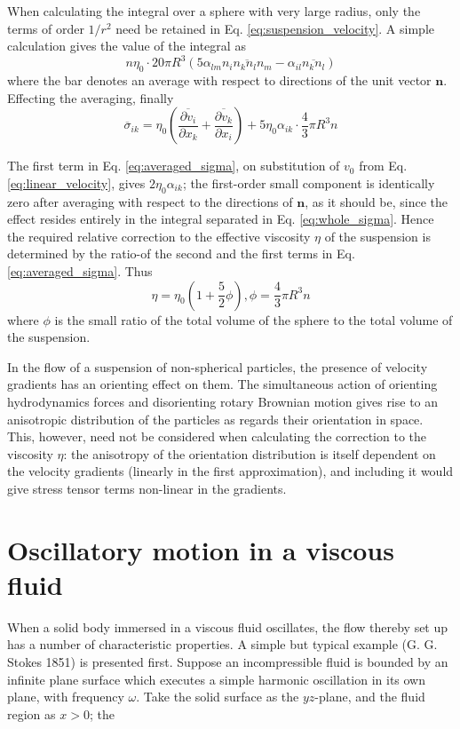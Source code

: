 \documentclass[conference]{IEEEtran}
\theoremstyle{definition}
\theoremstyle{remark}
\begin{document}
    When calculating the integral over a sphere with very large radius, only the terms of order $1/r^2$ need be retained in Eq. \ref{eq:suspension_velocity}. A simple calculation gives the value of the integral as
    \begin{equation*}
        n \eta_0 \cdot 20 \pi R^3 (5 \alpha_{lm} \overline{n_i n_k n_l n_m} - \alpha_{il} \overline{n_k n_l})
    \end{equation*}
    where the bar denotes an average with respect to directions of the unit vector $\mathbf{n}$. Effecting the averaging, finally
    \begin{equation}
        \overline{\sigma}_{ik} = \eta_0 \left( \dfrac{\overline{\partial v_i}}{\partial x_k} + \dfrac{\overline{\partial v_k}}{\partial x_i} \right) + 5 \eta_0 \alpha_{ik} \cdot \dfrac43 \pi R^3 n
        \label{eq:averaged_sigma}
    \end{equation}

    The first term in Eq. \ref{eq:averaged_sigma}, on substitution of $v_0$ from Eq. \ref{eq:linear_velocity}, gives $2 \eta_0 \alpha_{ik}$; the first-order small component is identically zero after averaging with respect to the directions of $\mathbf{n}$, as it should be, since the effect resides entirely in the integral separated in Eq. \ref{eq:whole_sigma}. Hence the required relative correction to the effective viscosity $\eta$ of the suspension is determined by the ratio-of the second and the first terms in Eq. \ref{eq:averaged_sigma}. Thus
    \begin{equation}
        \eta = \eta_0 (1 + \dfrac52 \phi), \phi = \dfrac43 \pi R^3 n
    \end{equation}
    where $\phi$ is the small ratio of the total volume of the sphere to the total volume of the suspension.

    In the flow of a suspension of non-spherical particles, the presence of velocity gradients has an orienting effect on them. The simultaneous action of orienting hydrodynamics forces and disorienting rotary Brownian motion gives rise to an anisotropic distribution of the particles as regards their orientation in space. This, however, need not be considered when calculating the correction to the viscosity $\eta$: the anisotropy of the orientation distribution is itself dependent on the velocity gradients (linearly in the first approximation), and including it would give stress tensor terms non-linear in the gradients.

    \section{Oscillatory motion in a viscous fluid}
    When a solid body immersed in a viscous fluid oscillates, the flow thereby set up has a number of characteristic properties. A simple but typical example (G. G. Stokes 1851) is presented first. Suppose an incompressible fluid is bounded by an infinite plane surface which executes a simple harmonic oscillation in its own plane, with frequency $\omega$. Take the solid surface as the $yz$-plane, and the fluid region as $x > 0$; the 
\end{document}

